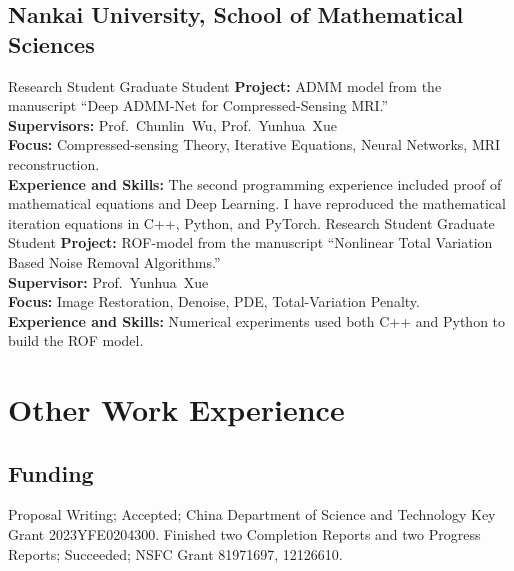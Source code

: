\documentclass[11pt,a4paper, final]{moderncv}
\newcommand{\spacesection}{\vspace{0.4cm}}
\newcommand{\spacesubsection}{\vspace{0.2cm}}
\begin{document}
	\subsection{\textbf{Nankai University, School of Mathematical Sciences}}
		{Research Student}
		{}
		{}{Graduate Student}
		{\fontsize{11pt}{14} \selectfont 
		\textbf{Project: }
		ADMM model from the manuscript “Deep ADMM-Net for Compressed-Sensing MRI.”\\
		\textbf{Supervisors: }
		Prof.~Chunlin~Wu, Prof.~Yunhua~Xue\\
		\textbf{Focus: }
		Compressed-sensing Theory, Iterative Equations, Neural Networks, MRI reconstruction.\\
		\textbf{Experience and Skills: }
		The second programming experience included proof of mathematical equations and Deep Learning. 
		I have reproduced the mathematical iteration equations in C++, Python, and PyTorch.
		}
		{Research Student}
		{}
		{}{Graduate Student}
		{\fontsize{11pt}{14} \selectfont 
		\textbf{Project: }
		ROF-model from the manuscript “Nonlinear Total Variation Based Noise Removal Algorithms.”\\
		\textbf{Supervisor: }
		Prof.~Yunhua~Xue\\
		\textbf{Focus: }
		Image Restoration, Denoise, PDE, Total-Variation Penalty.\\
		\textbf{Experience and Skills: }
		Numerical experiments used both C++ and Python to build the ROF model.
		}
\newpage
\section{\textbf{Other Work Experience}}
	\subsection{\textbf{Funding}}
		{Proposal Writing; Accepted; China Department of Science and Technology Key Grant 2023YFE0204300.}
		{Finished two Completion Reports and two Progress Reports; Succeeded; NSFC Grant 81971697, 12126610.}
\end{document}
